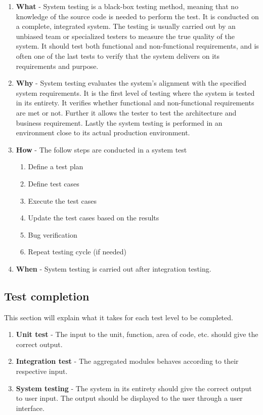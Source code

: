 \begin{enumerate}
    \item \textbf{What} - System testing is a black-box testing method, meaning that no knowledge of the source code is needed to perform the test. It is conducted on a complete, integrated system. The testing is usually carried out by an unbiased team or specialized testers to measure the true quality of the system. It should test both functional and non-functional requirements, and is often one of the last tests to verify that the system delivers on its requirements and purpose. 
    \item \textbf{Why} - System testing evaluates the system's alignment with the specified system requirements. It is the first level of testing where the system is tested in its entirety. It verifies whether functional and non-functional requirements are met or not. Further it allows the tester to test the architecture and business requirement. Lastly the system testing is performed in an environment close to its actual production environment. 
    \item \textbf{How} - The follow steps are conducted in a system test

    \begin{enumerate}
        \item Define a test plan 
        \item Define test cases 
        \item Execute the test cases
        \item Update the test cases based on the results
        \item Bug verification
        \item Repeat testing cycle (if needed)
    \end{enumerate}
    
    \item \textbf{When} - System testing is carried out after integration testing.
\end{enumerate}

\subsection{Test completion}

This section will explain what it takes for each test level to be completed.

\begin{enumerate}
    \item \textbf{Unit test} - The input to the unit, function, area of code, etc. should give the correct output. 
    \item \textbf{Integration test} - The aggregated modules behaves according to their respective input. 
    \item \textbf{System testing} - The system in its entirety should give the correct output to user input. The output should be displayed to the user through a user interface. 
\end{enumerate}

